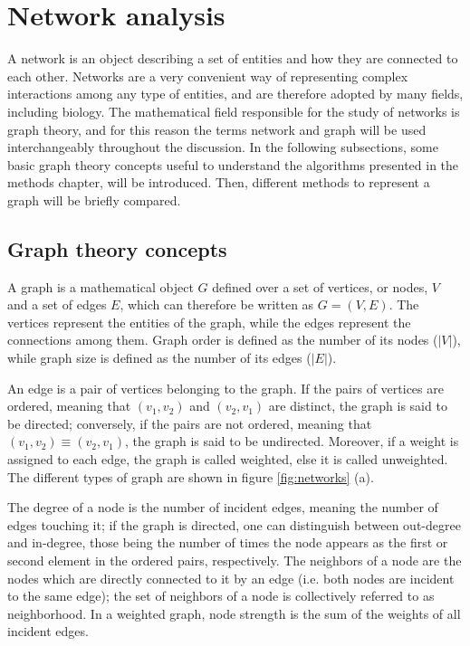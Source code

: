 \section{Network analysis}

A network is an object describing a set of entities and how they are connected to each other. Networks are a very convenient way of representing complex interactions among any type of entities, and are therefore adopted by many fields, including biology. The mathematical field responsible for the study of networks is graph theory, and for this reason the terms network and graph will be used interchangeably throughout the discussion. In the following subsections, some basic graph theory concepts useful to understand the algorithms presented in the methods chapter, will be introduced. Then, different methods to represent a graph will be briefly compared.

\subsection{Graph theory concepts}
A graph is a mathematical object $G$ defined over a set of vertices, or nodes, $V$ and a set of edges $E$, which can therefore be written as $G=(V,E)$. The vertices represent the entities of the graph, while the edges represent the connections among them. Graph order is defined as the number of its nodes ($|V|$), while graph size is defined as the number of its edges ($|E|$).

An edge is a pair of vertices belonging to the graph. If the pairs of vertices are ordered, meaning that $(v_1,v_2)$ and $(v_2, v_1)$ are distinct, the graph is said to be directed; conversely, if the pairs are not ordered, meaning that $(v_1,v_2) \equiv (v_2, v_1)$, the graph is said to be undirected. Moreover, if a weight is assigned to each edge, the graph is called weighted, else it is called unweighted. The different types of graph are shown in figure \ref{fig:networks} (a).

The degree of a node is the number of incident edges, meaning the number of edges touching it; if the graph is directed, one can distinguish between out-degree and in-degree, those being the number of times the node appears as the first or second element in the ordered pairs, respectively. The neighbors of a node are the nodes which are directly connected to it by an edge (i.e. both nodes are incident to the same edge); the set of neighbors of a node is collectively referred to as neighborhood. In a weighted graph, node strength is the sum of the weights of all incident edges. 

